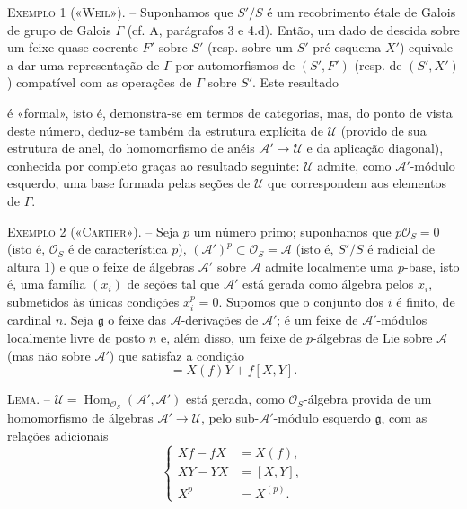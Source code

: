 \textsc{Exemplo 1 («Weil»).} -- Suponhamos que $S'/S$ é um recobrimento étale
de Galois de grupo de Galois $\Gamma$ (cf. A, parágrafos 3 e 4.d). Então, um
dado de descida sobre um feixe quase-coerente $F'$ sobre $S'$ (resp. sobre um
$S'$-pré-esquema $X'$) equivale a dar uma representação de $\Gamma$ por
automorfismos de $(S',F')$ (resp. de $(S',X')$) compatível com as operações
de $\Gamma$ sobre $S'$. Este resultado

é «formal», isto é, demonstra-se em termos de categorias, mas, do
ponto de vista deste número, deduz-se também da estrutura explícita de
$\mathcal U$ (provido de sua estrutura de anel, do homomorfismo de anéis
$\mathcal A'\longrightarrow\mathcal U$ e da aplicação diagonal), conhecida
por completo graças ao resultado seguinte: $\mathcal U$ admite, como
$\mathcal A'$-módulo esquerdo, uma base formada pelas seções de
$\mathcal U$ que correspondem aos elementos de $\Gamma$.

\textsc{Exemplo 2 («Cartier»).} -- Seja $p$ um número primo; suponhamos que
$p\mathcal O_S=0$ (isto é, $\mathcal O_S$ é de característica $p$),
$(\mathcal A')^p\subset\mathcal O_S=\mathcal A$ (isto é, $S'/S$ é radicial
de altura 1) e que o feixe de álgebras $\mathcal A'$ sobre $\mathcal A$ admite
localmente uma $p$-base, isto é, uma família $(x_i)$ de seções tal que
$\mathcal A'$ está gerada como álgebra pelos $x_i$, submetidos às únicas
condições $x_i^p=0$. Supomos que o conjunto dos $i$ é finito, de
cardinal $n$. Seja $\mathfrak g$ o feixe das $\mathcal A$-derivações de
$\mathcal A'$; é um feixe de $\mathcal A'$-módulos localmente livre de posto
$n$ e, além disso, um feixe de $p$-álgebras de Lie sobre $\mathcal A$ (mas não sobre
$\mathcal A'$) que satisfaz a condição
\begin{equation}
  [X,fY]=X(f)Y+f[X,Y].
  \tag{3.5}
\end{equation}

\textsc{Lema.} -- $\mathcal U=
\operatorname{Hom}_{\mathcal O_S}(\mathcal A',\mathcal A')$ está gerada,
como $\mathcal O_S$-álgebra provida de um homomorfismo de álgebras
$\mathcal A'\longrightarrow\mathcal U$, pelo sub-$\mathcal A'$-módulo
esquerdo $\mathfrak g$, com as relações adicionais
\begin{equation}
  \left\{
  \begin{aligned}
    Xf-fX&=X(f),\\
    XY-YX&=[X,Y],\\
    X^p&=X^{(p)}.
  \end{aligned}
  \right.
  \tag{3.6}
\end{equation}


